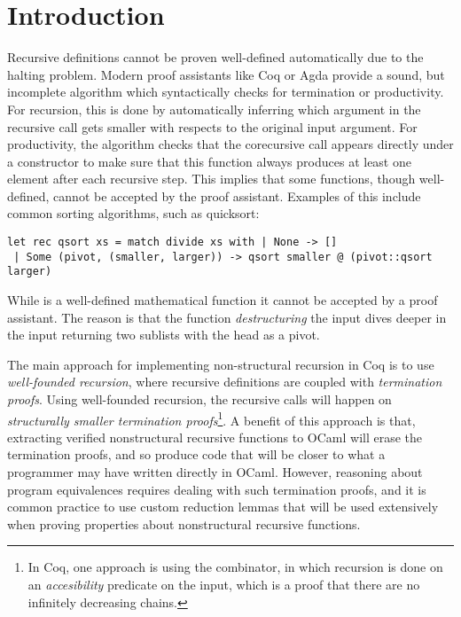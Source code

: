 \documentclass[ a4paper, UKenglish, cleveref, autoref, thm-restate]{lipics-v2021}
\begin{document}
\section{Introduction}
\label{sec:intro}
Recursive definitions cannot be proven well-defined automatically due to the
halting problem. Modern proof assistants like Coq or Agda provide a sound, but
incomplete algorithm which syntactically checks for termination or
productivity.  For recursion, this is done by automatically inferring
which argument in the recursive call gets smaller with respects to the original
input argument.  For productivity, the algorithm checks that the corecursive
call appears directly under a constructor to make sure that this function
always produces at least one element after each recursive step.
This implies that some functions, though well-defined, cannot be accepted by
the proof assistant. Examples of this include common sorting algorithms, such
as quicksort:
\begin{verbatim}
let rec qsort xs = match divide xs with | None -> []
 | Some (pivot, (smaller, larger)) -> qsort smaller @ (pivot::qsort larger)
\end{verbatim}
While  is a well-defined mathematical function it cannot be
accepted by a proof assistant.  The reason is that the 
function \emph{destructuring} the input dives deeper in the input returning
two sublists with the head as a pivot.

The main approach for implementing non-structural recursion in Coq is to use
\emph{well-founded recursion}, where recursive definitions are coupled with
\emph{termination proofs}.  Using well-founded recursion, the recursive calls
will happen on \emph{structurally smaller termination proofs}\footnote{In Coq,
one approach is using the  combinator, in which recursion is done on an
\emph{accesibility} predicate on the input, which is a proof that there are no
infinitely decreasing chains.}. A benefit of this approach is that, extracting
verified nonstructural recursive functions to OCaml will erase the termination
proofs, and so produce code that will be closer to what a programmer may have
written directly in OCaml. However, reasoning about program equivalences
requires dealing with such termination proofs, and it is common practice to use
custom reduction lemmas that will be used extensively when proving properties
about nonstructural recursive functions.
\end{document}
